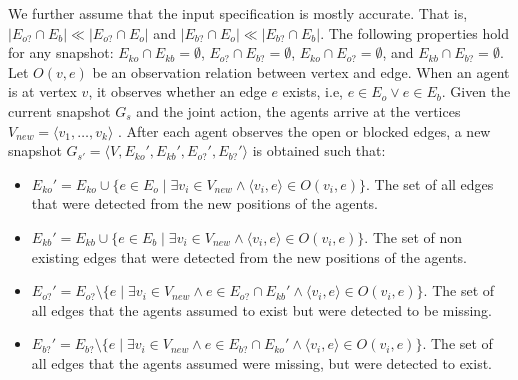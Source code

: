 \documentclass[letterpaper]{article} %
\def\
UrlFont{\rm}  %
\newcommand{\eo}{E_{o}} %
\newcommand{\eb}{E_{b}} %
\newcommand{\eko}{E_{ko}} %
\newcommand{\ekb}{E_{kb}} %
\newcommand{\eao}{E_{o?}} %
\newcommand{\eab}{E_{b?}} %
\theoremstyle{definition}
\begin{document}
We further assume that the input specification is mostly accurate. That is, $| \eao \cap E_b | \ll |\eao \cap E_o|$ and $| \eab \cap E_o | \ll |\eab \cap E_b|$.
The following properties hold for any snapshot:
$\eko \cap \ekb = \emptyset$, $\eao \cap \eab = \emptyset$, $\eko \cap \eao = \emptyset$, and $\ekb \cap \eab = \emptyset$. 
Let $O(v, e)$ be an observation relation between vertex and edge. When an agent is at vertex $v$, it observes whether an edge $e$ exists, i.e, $e \in \eo \lor e \in \eb$. Given the current snapshot $G_s$ and the joint action, the agents arrive at the vertices $V_{new}= \langle v_1, \dots, v_k \rangle$ . After each agent observes the open or blocked edges, a new snapshot $G_{s'} = \langle V, \eko', \ekb', \eao', \eab' \rangle $ is obtained such that:
\begin{itemize}
    \item $\eko' = \eko \cup \{e \in \eo \mid \exists v_i \in V_{new} \land \langle v_i, e \rangle \in O(v_i, e)\}$. The set of all edges that were detected from the new positions of the agents.
    \item $\ekb' = \ekb \cup \{e \in \eb \mid \exists v_i \in V_{new} \land \langle v_i, e \rangle \in O(v_i, e)\}$. The set of non existing edges that were detected from the new positions of the agents.
    \item $\eao' = \eao \setminus \{e \mid \exists v_i \in V_{new} \land e \in \eao \cap \ekb' \land \langle v_i, e \rangle \in O(v_i,e)\}$. The set of all edges that the agents assumed to exist but were detected to be missing.
    \item $\eab' = \eab \setminus \{e \mid \exists v_i \in V_{new} \land e \in \eab \cap \eko' \land \langle v_i, e \rangle \in O(v_i,e)\}$. The set of all edges that the agents assumed were missing, but were detected to exist.
\end{itemize}
\end{document}
